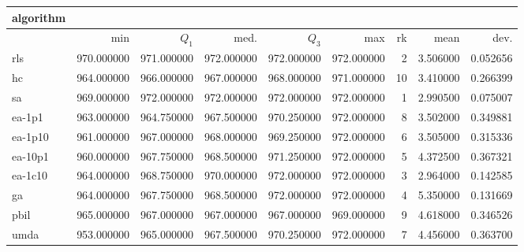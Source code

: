 \begin{tabular}{@{}l*{5}{>{{}}N{3}{0}}>{{}}N{2}{0}N{1}{3}N{1}{3}@{}}
\toprule
{algorithm} &  &  \\
\midrule
& {min} & {$Q_1$} & {med.} & {$Q_3$} & {max} & {rk} & {mean} & {dev.} \\
\midrule
rls & {\color{blue}} 970.000000 & 971.000000 & {\color{blue}} 972.000000 & {\color{blue}} 972.000000 & {\color{blue}} 972.000000 & 2 & 3.506000 & 0.052656 \\
 hc & 964.000000 & 966.000000 & 967.000000 & 968.000000 & 971.000000 & 10 & 3.410000 & 0.266399 \\
 sa & 969.000000 & {\color{blue}} 972.000000 & {\color{blue}} 972.000000 & {\color{blue}} 972.000000 & {\color{blue}} 972.000000 & 1 & 2.990500 & 0.075007 \\
 ea-1p1 & 963.000000 & 964.750000 & 967.500000 & 970.250000 & {\color{blue}} 972.000000 & 8 & 3.502000 & 0.349881 \\
 ea-1p10 & 961.000000 & 967.000000 & 968.000000 & 969.250000 & {\color{blue}} 972.000000 & 6 & 3.505000 & 0.315336 \\
 ea-10p1 & 960.000000 & 967.750000 & 968.500000 & 971.250000 & {\color{blue}} 972.000000 & 5 & 4.372500 & 0.367321 \\
 ea-1c10 & 964.000000 & 968.750000 & 970.000000 & {\color{blue}} 972.000000 & {\color{blue}} 972.000000 & 3 & 2.964000 & 0.142585 \\
 ga & 964.000000 & 967.750000 & 968.500000 & {\color{blue}} 972.000000 & {\color{blue}} 972.000000 & 4 & 5.350000 & 0.131669 \\
 pbil & 965.000000 & 967.000000 & 967.000000 & 967.000000 & 969.000000 & 9 & 4.618000 & 0.346526 \\
 umda & 953.000000 & 965.000000 & 967.500000 & 970.250000 & {\color{blue}} 972.000000 & 7 & 4.456000 & 0.363700 \\
 \bottomrule
\end{tabular}
